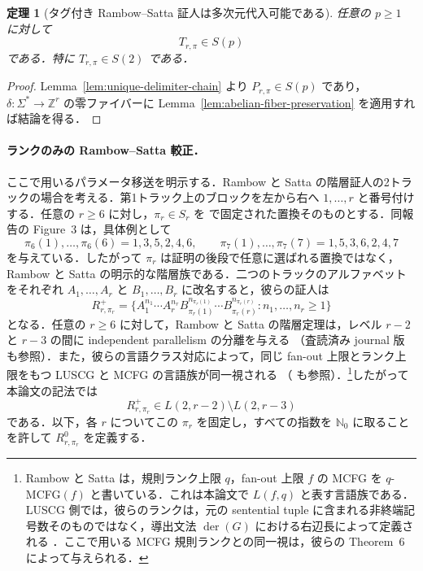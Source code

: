 \documentclass[11pt,a4paper]{ltjsarticle}
\numberwithin{equation}{section}
\theoremstyle{plain}
\newtheorem{theorem}{定理}[section]
\theoremstyle{definition}
\theoremstyle{remark}
\begin{document}
\begin{theorem}[タグ付き Rambow--Satta 証人は多次元代入可能である]
\label{thm:tagged-rs-s2}
任意の $p\ge1$ に対して
\[
  T_{r,\pi}\in S(p)
\]
である．特に $T_{r,\pi}\in S(2)$ である．
\end{theorem}

\begin{proof}
Lemma~\ref{lem:unique-delimiter-chain} より $P_{r,\pi}\in S(p)$ であり，$\delta:\Sigma^*\to\mathbb Z^r$ の零ファイバーに Lemma~\ref{lem:abelian-fiber-preservation} を適用すれば結論を得る．
\end{proof}

\paragraph{ランクのみの Rambow--Satta 較正．}
\enlargethispage{2pt}
ここで用いるパラメータ移送を明示する．Rambow と Satta の階層証人の2トラックの場合を考える．第1トラック上のブロックを左から右へ $1,\ldots,r$ と番号付けする．任意の $r\ge6$ に対し，$\pi_r\in S_r$ を \cite[Definition~6]{RambowSatta1994} で固定された置換そのものとする．同報告の Figure~3 は，具体例として
\[
  \pi_6(1),\ldots,\pi_6(6)=1,3,5,2,4,6,
  \qquad
  \pi_7(1),\ldots,\pi_7(7)=1,5,3,6,2,4,7
\]
を与えている．したがって $\pi_r$ は証明の後段で任意に選ばれる置換ではなく，Rambow と Satta の明示的な階層族である．二つのトラックのアルファベットをそれぞれ $A_1,\ldots,A_r$ と $B_1,\ldots,B_r$ に改名すると，彼らの証人は
\[
 R^+_{r,\pi_r}=\{A_1^{n_1}\cdots A_r^{n_r}
 B_{\pi_r(1)}^{n_{\pi_r(1)}}\cdots B_{\pi_r(r)}^{n_{\pi_r(r)}}:
 n_1,\ldots,n_r\ge1\}
\]
となる．任意の $r\ge6$ に対して，Rambow と Satta の階層定理は，レベル $r-2$ と $r-3$ の間に independent parallelism の分離を与える
\cite[Theorem~1]{RambowSatta1994}（査読済み journal 版 \cite{RambowSatta1999} も参照）．また，彼らの言語クラス対応によって，同じ fan-out 上限とランク上限をもつ LUSCG と MCFG の言語族が同一視される
\cite[Theorem~6]{RambowSatta1994}（\cite{RambowSatta1999} も参照）．\footnote{Rambow と Satta は，規則ランク上限 $q$，fan-out 上限 $f$ の MCFG を $q$-MCFG$(f)$ と書いている．これは本論文で $L(f,q)$ と表す言語族である．LUSCG 側では，彼らのランクは，元の sentential tuple に含まれる非終端記号数そのものではなく，導出文法 $\operatorname{der}(G)$ における右辺長によって定義される \cite[Definition~4]{RambowSatta1994}．ここで用いる MCFG 規則ランクとの同一視は，彼らの Theorem~6 によって与えられる．}したがって本論文の記法では
\[
 R^+_{r,\pi_r}\in L(2,r-2)\setminus L(2,r-3)
\]
である．以下，各 $r$ についてこの $\pi_r$ を固定し，すべての指数を $\mathbb N_0$ に取ることを許して $R^0_{r,\pi_r}$ を定義する．
\end{document}
